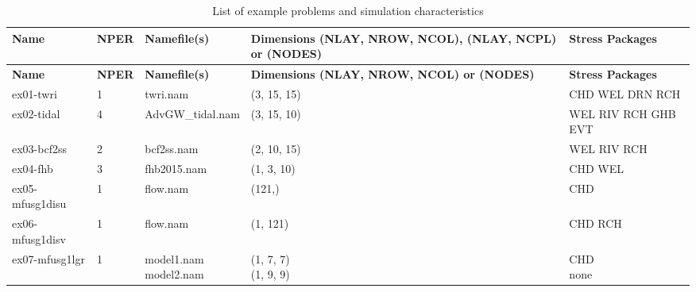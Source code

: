 
\small
\begin{longtable}{p{3cm} p{1cm} p{3cm} p{2.5cm}p{4cm}}
\caption{List of example problems and simulation characteristics}\tabularnewline


\hline
\hline
\textbf{Name} & \textbf{NPER} & \textbf{Namefile(s)} & \textbf{Dimensions (NLAY, NROW, NCOL), (NLAY, NCPL) or (NODES)}  & \textbf{Stress Packages} \\
\hline
\endfirsthead

\hline
\hline
\textbf{Name} & \textbf{NPER} & \textbf{Namefile(s)} & \textbf{Dimensions (NLAY, NROW, NCOL) or (NODES)}  & \textbf{Stress Packages} \\
\hline
\endhead


ex01-twri & 1 & \parbox[t]{3cm}{ twri.nam \\}& \parbox[t]{3cm}{ (3, 15, 15) \\}& \parbox[t]{4cm}{ CHD WEL DRN RCH  \\}\\
\hline
ex02-tidal & 4 & \parbox[t]{3cm}{ AdvGW\_tidal.nam \\}& \parbox[t]{3cm}{ (3, 15, 10) \\}& \parbox[t]{4cm}{ WEL RIV RCH GHB EVT  \\}\\
\hline
ex03-bcf2ss & 2 & \parbox[t]{3cm}{ bcf2ss.nam \\}& \parbox[t]{3cm}{ (2, 10, 15) \\}& \parbox[t]{4cm}{ WEL RIV RCH  \\}\\
\hline
ex04-fhb & 3 & \parbox[t]{3cm}{ fhb2015.nam \\}& \parbox[t]{3cm}{ (1, 3, 10) \\}& \parbox[t]{4cm}{ CHD WEL  \\}\\
\hline
ex05-mfusg1disu & 1 & \parbox[t]{3cm}{ flow.nam \\}& \parbox[t]{3cm}{ (121,) \\}& \parbox[t]{4cm}{ CHD  \\}\\
\hline
ex06-mfusg1disv & 1 & \parbox[t]{3cm}{ flow.nam \\}& \parbox[t]{3cm}{ (1, 121) \\}& \parbox[t]{4cm}{ CHD RCH  \\}\\
\hline
ex07-mfusg1lgr & 1 & \parbox[t]{3cm}{ model1.nam \\ model2.nam \\}& \parbox[t]{3cm}{ (1, 7, 7) \\ (1, 9, 9) \\}& \parbox[t]{4cm}{ CHD  \\ none \\}\\

\end{longtable}
